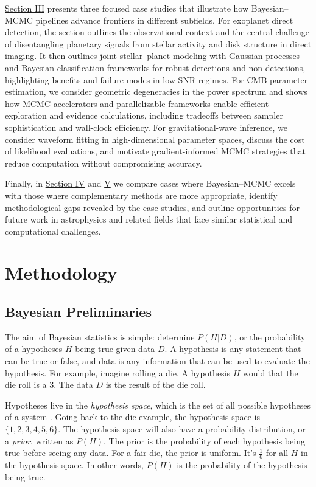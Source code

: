 \documentclass[preprint,longauthor]{aastex631}
\numberwithin{equation}{section}
\begin{document}
\hyperref[sec:CaseStudies]{Section III} presents three focused case studies that illustrate how Bayesian–MCMC pipelines advance frontiers in different subfields. For exoplanet direct detection, the section outlines the observational context and the central challenge of disentangling planetary signals from stellar activity and disk structure in direct imaging. It then outlines joint stellar–planet modeling with Gaussian processes and Bayesian classification frameworks for robust detections and non-detections, highlighting benefits and failure modes in low SNR regimes. For CMB parameter estimation, we consider geometric degeneracies in the power spectrum and shows how MCMC accelerators and parallelizable frameworks enable efficient exploration and evidence calculations, including tradeoffs between sampler sophistication and wall-clock efficiency. For gravitational-wave inference, we consider waveform fitting in high-dimensional parameter spaces, discuss the cost of likelihood evaluations, and motivate gradient-informed MCMC strategies that reduce computation without compromising accuracy.

Finally, in \hyperref[placeholder]{Section IV} and \hyperref[placeholder]{V} we compare cases where Bayesian–MCMC excels with those where complementary methods are more appropriate, identify methodological gaps revealed by the case studies, and outline opportunities for future work in astrophysics and related fields that face similar statistical and computational challenges.

\section{Methodology}
\label{sec:Methodology}

\subsection{Bayesian Preliminaries} %
The aim of Bayesian statistics is simple: determine $P(H|D)$, or the probability of a hypotheses $H$ being true given data $D$. A hypothesis is any statement that can be true or false, and data is any information that can be used to evaluate the hypothesis. For example, imagine rolling a die. A hypothesis $H$ would that the die roll is a 3. The data $D$ is the result of the die roll.

Hypotheses live in the \textit{hypothesis space}, which is the set of all possible hypotheses of a system \citep{brewer1BayesianInference2018}. Going back to the die example, the hypothesis space is $\{1,2,3,4,5,6\}$. The hypothesis space will also have a probability distribution, or a \textit{prior}, written as $P(H)$. The prior is the probability of each hypothesis being true before seeing any data. For a fair die, the prior is uniform. It's $\frac{1}{6}$ for all $H$ in the hypothesis space. In other words, $P(H)$ is the probability of the hypothesis being true.
\end{document}
